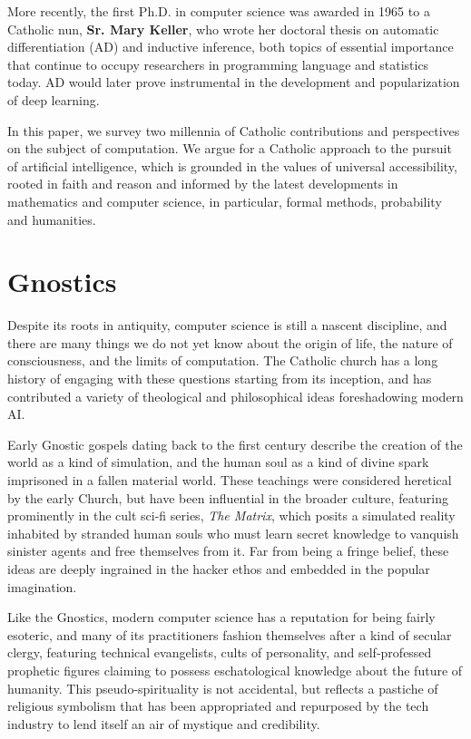 \documentclass[sigplan,nonacm]{acmart}\settopmatter{printfolios=false,printccs=false,printacmref=false}
\begin{document}
  More recently, the first Ph.D. in computer science was awarded in 1965 to a Catholic nun, \textbf{Sr. Mary Keller}, who wrote her doctoral thesis on automatic differentiation (AD) and inductive inference, both topics of essential importance that continue to occupy researchers in programming language and statistics today. AD would later prove instrumental in the development and popularization of deep learning.

  In this paper, we survey two millennia of Catholic contributions and perspectives on the subject of computation. We argue for a Catholic approach to the pursuit of artificial intelligence, which is grounded in the values of universal accessibility, rooted in faith and reason and informed by the latest developments in mathematics and computer science, in particular, formal methods, probability and humanities.

 \section{Gnostics}

  Despite its roots in antiquity, computer science is still a nascent discipline, and there are many things we do not yet know about the origin of life, the nature of consciousness, and the limits of computation. The Catholic church has a long history of engaging with these questions starting from its inception, and has contributed a variety of theological and philosophical ideas foreshadowing modern AI.

  Early Gnostic gospels dating back to the first century describe the creation of the world as a kind of simulation, and the human soul as a kind of divine spark imprisoned in a fallen material world. These teachings were considered heretical by the early Church, but have been influential in the broader culture, featuring prominently in the cult sci-fi series, \textit{The Matrix}, which posits a simulated reality inhabited by stranded human souls who must learn secret knowledge to vanquish sinister agents and free themselves from it. Far from being a fringe belief, these ideas are deeply ingrained in the hacker ethos and embedded in the popular imagination.

  Like the Gnostics, modern computer science has a reputation for being fairly esoteric, and many of its practitioners fashion themselves after a kind of secular clergy, featuring technical evangelists, cults of personality, and self-professed prophetic figures claiming to possess eschatological knowledge about the future of humanity. This pseudo-spirituality is not accidental, but reflects a pastiche of religious symbolism that has been appropriated and repurposed by the tech industry to lend itself an air of mystique and credibility.
\end{document}
